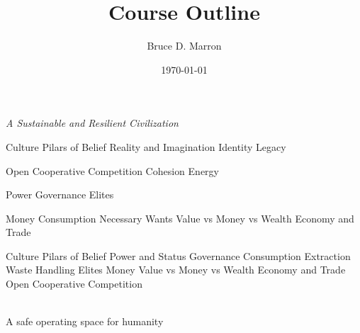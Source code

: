 \documentclass[12pt, letterpaper]{article}
\title{\vspace{-15mm}\fontsize{14pt}{10pt}
                    \selectfont \textbf{Course Outline}   %
                    \vspace{-7mm}
      }
\author{
     \normalsize Bruce D. Marron \\                     %
     \vspace{-5mm}
}
\date{\normalsize \today}
\begin{document}
\begin{singlespacing}
\end{singlespacing}
\thispagestyle{fancy}                           %


\large
\begin{flushleft}
\textit{A Sustainable and Resilient Civilization}
\end{flushleft}

\normalsize
\begin{outline}[enumerate]
\1 Culture
\2 Pilars of Belief
\3 Reality and Imagination
\3 Identity Legacy

\2 Open Cooperative Competition
\3 Cohesion
\3 Energy


\1 Power
\2 Governance
\2 Elites

\1 Money
\2 Consumption
\3 Necessary
\3 Wants
\2 Value vs Money vs Wealth
\2 Economy and Trade


\2 Culture
\2 Pilars of Belief
\2 Power and Status
\2 Governance
\2 Consumption
\2 Extraction
\2 Waste Handling
\2 Elites
\1 Money
\2 Value vs Money vs Wealth
\2 Economy and Trade
\2 Open Cooperative Competition

\end{outline}



\textit{\cite{rockstrom_2009_safe}}\\
A safe operating space for humanity



\clearpage 
\renewcommand{\thepage}{}
\printbibliography
\end{document}
